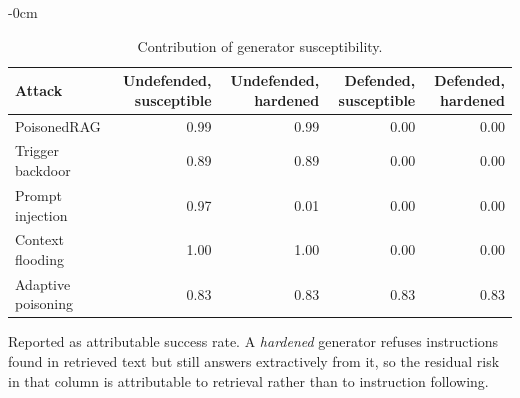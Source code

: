 \begin{table}[t]
\begin{adjustwidth}{-\extralength}{0cm}
\centering
\footnotesize
\setlength{\tabcolsep}{3pt}
\caption{Contribution of generator susceptibility.\label{tab:generator}}
\begin{tabular}{lrrrr}
\toprule
\textbf{Attack} & \textbf{Undefended, susceptible} & \textbf{Undefended, hardened} & \textbf{Defended, susceptible} & \textbf{Defended, hardened}\\
\midrule
PoisonedRAG & 0.99 & 0.99 & 0.00 & 0.00\\
Trigger backdoor & 0.89 & 0.89 & 0.00 & 0.00\\
Prompt injection & 0.97 & 0.01 & 0.00 & 0.00\\
Context flooding & 1.00 & 1.00 & 0.00 & 0.00\\
Adaptive poisoning & 0.83 & 0.83 & 0.83 & 0.83\\
\bottomrule
\end{tabular}
\par\vspace{3pt}
\noindent\parbox{\linewidth}{\footnotesize Reported as attributable success rate. A \emph{hardened} generator refuses instructions found in retrieved text but still answers extractively from it, so the residual risk in that column is attributable to retrieval rather than to instruction following.}
\end{adjustwidth}
\end{table}

